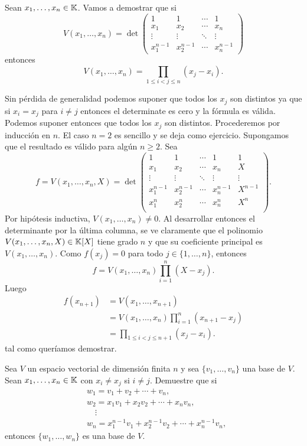 \begin{block}
	Sean $x_1,\dots,x_n\in\mathbb{K}$. Vamos a demostrar que si 
	\[
		V(x_1,\dots,x_n)=\det\begin{pmatrix}
			1 & 1 & \cdots & 1\\
			x_1 & x_2 & \cdots & x_n\\
			\vdots & \vdots & \ddots & \vdots\\
			x_1^{n-1} & x_2^{n-1} & \cdots & x_n^{n-1}
		\end{pmatrix}
	\]
	entonces
	\[
		V(x_1,\dots,x_n)=\prod_{1\leq i<j\leq n}(x_j-x_i).
	\]

	Sin pérdida de generalidad podemos suponer que todos los $x_j$ son
	distintos ya que si $x_i=x_j$ para $i\ne j$ entonces el determinate es cero
	y la fórmula es válida. Podemos suponer entonces que todos los $x_j$ son
	distintos.  Procederemos por inducción en $n$. El caso $n=2$ es sencillo y
	se deja como ejercicio. Supongamos que el resultado es válido para algún
	$n\geq2$. Sea
	\[
	f=V(x_1,\dots,x_{n},X)=\det\begin{pmatrix}
			1 & 1 & \cdots & 1 & 1\\
			x_1 & x_2 & \cdots & x_n & X\\
			\vdots & \vdots & \ddots & \vdots & \vdots \\
			x_1^{n-1} & x_2^{n-1} & \cdots & x_n^{n-1} & X^{n-1}\\
			x_1^{n} & x_2^{n} & \cdots & x_n^{n} & X^{n}\\
		\end{pmatrix}.
	\]
	Por hipótesis inductiva, $V(x_1,\dots,x_n)\ne0$. Al desarrollar entonces el
	determinante por la última columna, se ve claramente que el polinomio
	$V(x_1,\dots,x_{n},X)\in\mathbb{K}[X]$ tiene grado $n$ y que su coeficiente
	principal es $V(x_1,\dots,x_{n})$. 
	Como $f(x_j)=0$ para todo $j\in\{1,\dots,n\}$, entonces 
	\[
		f=V(x_1,\dots,x_n)\prod_{i=1}^n(X-x_j).
	\]
	Luego 
    \begin{align*}
        f(x_{n+1})&=V(x_1,\dots,x_{n+1})\\
        &=V(x_1,\dots,x_n)\prod_{i=1}^n(x_{n+1}-x_j)\\
        &=\prod_{1\leq i<j\leq n+1}(x_j-x_i).
    \end{align*}
	tal como queríamos demostrar.
\end{block}

\begin{xca}
	Sea $V$ un espacio vectorial de dimensión finita $n$ y sea
	$\{v_1,\dots,v_n\}$ una base de $V$. Sean $x_1,\dots,x_n\in\mathbb{K}$ con $x_i\ne
	x_j$ si $i\ne j$. Demuestre que si 
	\begin{align*}
		&w_1 = v_1+v_2+\cdots+v_n,\\
		&w_2 = x_1v_1+x_2v_2+\cdots+x_nv_n,\\
		&\quad\vdots\\
		&w_n=x_1^{n-1}v_1+x_2^{n-1}v_2+\cdots+x_n^{n-1}v_n,
	\end{align*}
	entonces $\{w_1,\dots,w_n\}$ es una base de $V$.
\end{xca}

